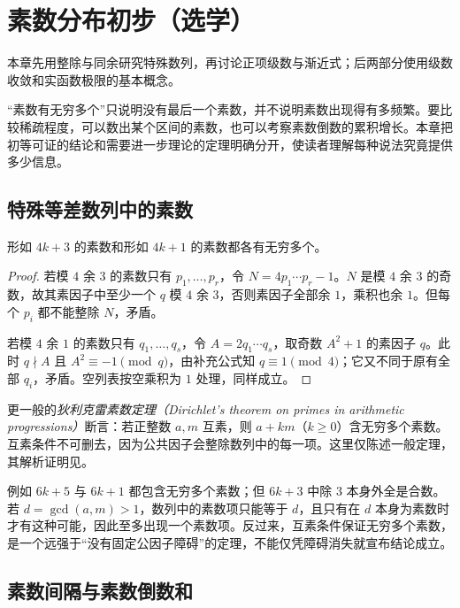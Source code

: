 \setcounter{chapter}{12} %
\chapter{素数分布初步（选学）}
\label{ch:prime-distribution}

本章先用整除与同余研究特殊数列，再讨论正项级数与渐近式；后两部分使用级数收敛和实函数极限的基本概念。

“素数有无穷多个”只说明没有最后一个素数，并不说明素数出现得有多频繁。要比较稀疏程度，可以数出某个区间的素数，也可以考察素数倒数的累积增长。本章把初等可证的结论和需要进一步理论的定理明确分开，使读者理解每种说法究竟提供多少信息。

\section{特殊等差数列中的素数}

\begin{proposition}
形如 $4k+3$ 的素数和形如 $4k+1$ 的素数都各有无穷多个。
\end{proposition}
\begin{proof}
若模 $4$ 余 $3$ 的素数只有 $p_1,\ldots,p_r$，令 $N=4p_1\cdots p_r-1$。$N$ 是模 $4$ 余 $3$ 的奇数，故其素因子中至少一个 $q$ 模 $4$ 余 $3$，否则素因子全部余 $1$，乘积也余 $1$。但每个 $p_i$ 都不能整除 $N$，矛盾。

若模 $4$ 余 $1$ 的素数只有 $q_1,\ldots,q_s$，令 $A=2q_1\cdots q_s$，取奇数 $A^2+1$ 的素因子 $q$。此时 $q\nmid A$ 且 $A^2\equiv-1\pmod q$，由补充公式知 $q\equiv1\pmod4$；它又不同于原有全部 $q_i$，矛盾。空列表按空乘积为 $1$ 处理，同样成立。
\end{proof}

更一般的\emph{狄利克雷素数定理（Dirichlet's theorem on primes in arithmetic progressions）}断言：若正整数 $a,m$ 互素，则 $a+km$（$k\ge0$）含无穷多个素数。互素条件不可删去，因为公共因子会整除数列中的每一项。这里仅陈述一般定理，其解析证明见\cite{kedlaya-dirichlet}。

例如 $6k+5$ 与 $6k+1$ 都包含无穷多个素数；但 $6k+3$ 中除 $3$ 本身外全是合数。若 $d=\gcd(a,m)>1$，数列中的素数项只能等于 $d$，且只有在 $d$ 本身为素数时才有这种可能，因此至多出现一个素数项。反过来，互素条件保证无穷多个素数，是一个远强于“没有固定公因子障碍”的定理，不能仅凭障碍消失就宣布结论成立。

\section{素数间隔与素数倒数和}

